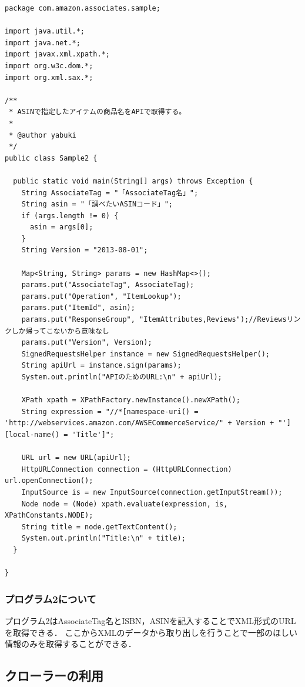 \begin{lstlisting}
package com.amazon.associates.sample;

import java.util.*;
import java.net.*;
import javax.xml.xpath.*;
import org.w3c.dom.*;
import org.xml.sax.*;

/**
 * ASINで指定したアイテムの商品名をAPIで取得する。
 *
 * @author yabuki
 */
public class Sample2 {

  public static void main(String[] args) throws Exception {
    String AssociateTag = "「AssociateTag名」";
    String asin = "「調べたいASINコード」";
    if (args.length != 0) {
      asin = args[0];
    }
    String Version = "2013-08-01";

    Map<String, String> params = new HashMap<>();
    params.put("AssociateTag", AssociateTag);
    params.put("Operation", "ItemLookup");
    params.put("ItemId", asin);
    params.put("ResponseGroup", "ItemAttributes,Reviews");//Reviewsリンクしか帰ってこないから意味なし
    params.put("Version", Version);
    SignedRequestsHelper instance = new SignedRequestsHelper();
    String apiUrl = instance.sign(params);
    System.out.println("APIのためのURL:\n" + apiUrl);

    XPath xpath = XPathFactory.newInstance().newXPath();
    String expression = "//*[namespace-uri() = 'http://webservices.amazon.com/AWSECommerceService/" + Version + "'][local-name() = 'Title']";

    URL url = new URL(apiUrl);
    HttpURLConnection connection = (HttpURLConnection) url.openConnection();
    InputSource is = new InputSource(connection.getInputStream());
    Node node = (Node) xpath.evaluate(expression, is, XPathConstants.NODE);
    String title = node.getTextContent();
    System.out.println("Title:\n" + title);
  }

}

\end{lstlisting}



\subsubsection{プログラム2について}

プログラム2はAssociateTag名とISBN，ASINを記入することでXML形式のURLを取得できる．
ここからXMLのデータから取り出しを行うことで一部のほしい情報のみを取得することができる．

\subsection{クローラーの利用}

